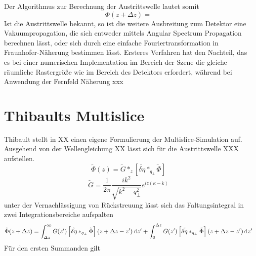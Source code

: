 	Der Algorithmus zur Berechnung der Austrittswelle lautet somit
	\begin{equation}
\Phi(z+\Delta z)=
	\end{equation}
	Ist die Austrittswelle bekannt, so ist die weitere Ausbreitung zum Detektor eine Vakuumpropagation, die sich entweder mittels Angular Spectrum Propagation berechnen lässt, oder sich durch eine einfache Fouriertransformation in Fraunhofer-Näherung bestimmen lässt. Ersteres Verfahren hat den Nachteil, das es bei einer numerischen Implementation im Bereich der Szene die gleiche räumliche Rastergröße wie im Bereich des Detektors erfordert, während bei Anwendung der Fernfeld Näherung xxx
\section{Thibaults Multislice}
Thibault stellt in XX einen eigene Formulierung der Multislice-Simulation auf. Ausgehend von der Wellengleichung XX
lässt sich für die Austrittswelle XXX aufstellen.
\begin{equation}
\tilde{\Phi}(z)=\tilde{G}\ast_z\left[\tilde{\delta\eta}\ast_{q_\perp} \tilde{\Phi}\right]
\end{equation}
\begin{equation}
\tilde{G}=\frac{1}{2\pi}\frac{ik^2}{\sqrt{k^2-q_\perp^2}}e^{iz(\kappa-k)}
\end{equation}
unter der Vernachlässigung von Rückstreuung lässt sich das Faltungsintegral in zwei Integrationsbereiche aufspalten
\begin{equation}
\tilde{\Phi}(z+\Delta z)=
\int_{\Delta z}^{\infty} \tilde{G}(z')\left[\tilde{\delta\eta}\ast_{q_\perp} \tilde{\Phi}\right](z+\Delta z-z')\dif z'
+
\int_{0}^{\Delta z} \tilde{G}(z')\left[\tilde{\delta\eta}\ast_{q_\perp} \tilde{\Phi}\right](z+\Delta z-z')\dif z'
\end{equation}
Für den ersten Summanden gilt

